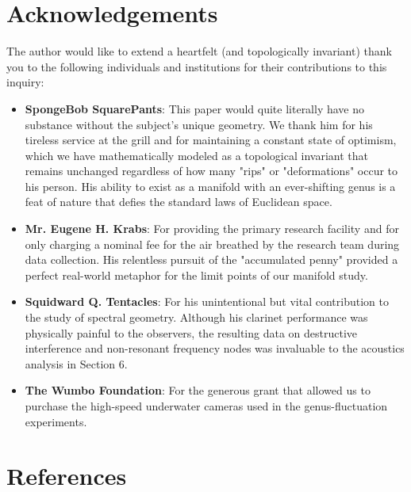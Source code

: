 \documentclass[12pt]{article}
\begin{document}
\newpage

\newpage
\newpage
\section*{Acknowledgements}

The author would like to extend a heartfelt (and topologically invariant) thank you to the following individuals and institutions for their contributions to this inquiry:

\begin{itemize}
    \item \textbf{SpongeBob SquarePants}: This paper would quite literally have no substance without the subject's unique geometry. We thank him for his tireless service at the grill and for maintaining a constant state of optimism, which we have mathematically modeled as a topological invariant that remains unchanged regardless of how many "rips" or "deformations" occur to his person. His ability to exist as a manifold with an ever-shifting genus is a feat of nature that defies the standard laws of Euclidean space.
    \item \textbf{Mr. Eugene H. Krabs}: For providing the primary research facility and for only charging a nominal fee for the air breathed by the research team during data collection. His relentless pursuit of the "accumulated penny" provided a perfect real-world metaphor for the limit points of our manifold study.
    \item \textbf{Squidward Q. Tentacles}: For his unintentional but vital contribution to the study of spectral geometry. Although his clarinet performance was physically painful to the observers, the resulting data on destructive interference and non-resonant frequency nodes was invaluable to the acoustics analysis in Section 6.
    \item \textbf{The Wumbo Foundation}: For the generous grant that allowed us to purchase the high-speed underwater cameras used in the genus-fluctuation experiments.
\end{itemize}

\vspace{1.5cm}

\newpage

\newpage
\section*{References}
\end{document}
